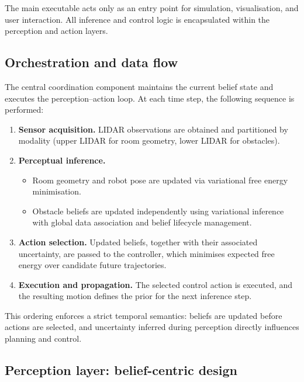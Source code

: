 \documentclass[a4paper, twoside]{article}
\begin{document}
The main executable acts only as an entry point for simulation, visualisation, and user interaction. All
inference and control logic is encapsulated within the perception and action layers.

\subsection{Orchestration and data flow}

The central coordination component maintains the current belief state and executes the perception--action
loop. At each time step, the following sequence is performed:

\begin{enumerate}
    \item \textbf{Sensor acquisition.} LIDAR observations are obtained and partitioned by modality
    (upper LIDAR for room geometry, lower LIDAR for obstacles).
    
    \item \textbf{Perceptual inference.}
    \begin{itemize}
        \item Room geometry and robot pose are updated via variational free energy minimisation.
        \item Obstacle beliefs are updated independently using variational inference with global data
        association and belief lifecycle management.
    \end{itemize}
    
    \item \textbf{Action selection.} Updated beliefs, together with their associated uncertainty, are passed
    to the controller, which minimises expected free energy over candidate future trajectories.
    
    \item \textbf{Execution and propagation.} The selected control action is executed, and the resulting
    motion defines the prior for the next inference step.
\end{enumerate}

This ordering enforces a strict temporal semantics: beliefs are updated before actions are selected, and
uncertainty inferred during perception directly influences planning and control.

\subsection{Perception layer: belief-centric design}
\end{document}
